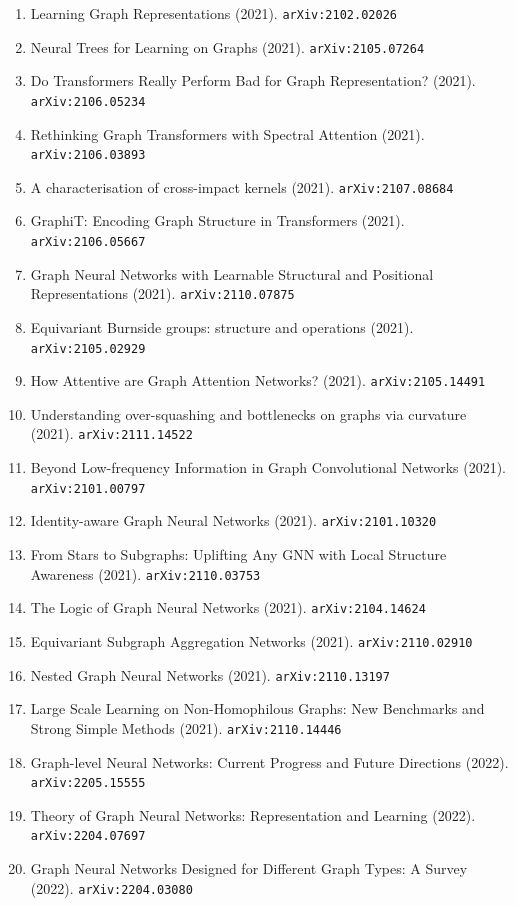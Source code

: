 \documentclass[11pt]{article}
\begin{document}
\begin{enumerate}
  \item Learning Graph Representations (2021). \texttt{arXiv:2102.02026}
  \item Neural Trees for Learning on Graphs (2021). \texttt{arXiv:2105.07264}
  \item Do Transformers Really Perform Bad for Graph Representation? (2021). \texttt{arXiv:2106.05234}
  \item Rethinking Graph Transformers with Spectral Attention (2021). \texttt{arXiv:2106.03893}
  \item A characterisation of cross-impact kernels (2021). \texttt{arXiv:2107.08684}
  \item GraphiT: Encoding Graph Structure in Transformers (2021). \texttt{arXiv:2106.05667}
  \item Graph Neural Networks with Learnable Structural and Positional
  Representations (2021). \texttt{arXiv:2110.07875}
  \item Equivariant Burnside groups: structure and operations (2021). \texttt{arXiv:2105.02929}
  \item How Attentive are Graph Attention Networks? (2021). \texttt{arXiv:2105.14491}
  \item Understanding over-squashing and bottlenecks on graphs via curvature (2021). \texttt{arXiv:2111.14522}
  \item Beyond Low-frequency Information in Graph Convolutional Networks (2021). \texttt{arXiv:2101.00797}
  \item Identity-aware Graph Neural Networks (2021). \texttt{arXiv:2101.10320}
  \item From Stars to Subgraphs: Uplifting Any GNN with Local Structure
  Awareness (2021). \texttt{arXiv:2110.03753}
  \item The Logic of Graph Neural Networks (2021). \texttt{arXiv:2104.14624}
  \item Equivariant Subgraph Aggregation Networks (2021). \texttt{arXiv:2110.02910}
  \item Nested Graph Neural Networks (2021). \texttt{arXiv:2110.13197}
  \item Large Scale Learning on Non-Homophilous Graphs: New Benchmarks and
  Strong Simple Methods (2021). \texttt{arXiv:2110.14446}
  \item Graph-level Neural Networks: Current Progress and Future Directions (2022). \texttt{arXiv:2205.15555}
  \item Theory of Graph Neural Networks: Representation and Learning (2022). \texttt{arXiv:2204.07697}
  \item Graph Neural Networks Designed for Different Graph Types: A Survey (2022). \texttt{arXiv:2204.03080}

\end{enumerate}
\end{document}
